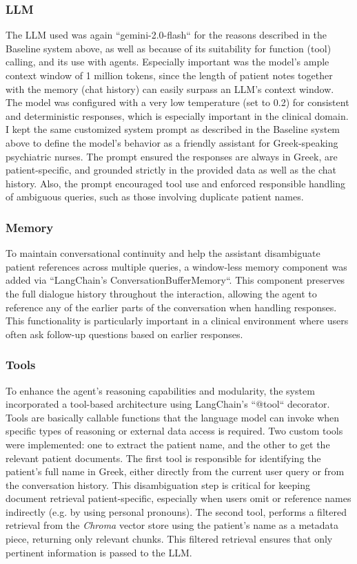 \subsubsection{LLM}
The LLM used was again ``gemini-2.0-flash`` for the reasons described in the Baseline system above, as well as because of its suitability for function (tool) calling, and its use with agents. Especially important was the model's ample context window of 1 million tokens, since the length of patient notes together with the memory (chat history) can easily surpass an LLM’s context window. The model was configured with a very low temperature (set to 0.2) for consistent and deterministic responses, which is especially important in the clinical domain. I kept the same customized system prompt as described in the Baseline system above to define the model's behavior as a friendly assistant for Greek-speaking psychiatric nurses. The prompt ensured the responses are always in Greek, are patient-specific, and grounded strictly in the provided data as well as the chat history. Also, the prompt encouraged tool use and enforced responsible handling of ambiguous queries, such as those involving duplicate patient names.

\subsubsection{Memory}
To maintain conversational continuity and  help the assistant disambiguate patient references across multiple queries, a window-less memory component was added via ``LangChain's ConversationBufferMemory``. This component preserves the full dialogue history throughout the interaction, allowing the agent to reference any of the earlier parts of the conversation when handling responses. This functionality is particularly important in a clinical environment where users often ask follow-up questions based on earlier responses.

\subsubsection{Tools} \label{tools}
To enhance the agent's reasoning capabilities and modularity, the system incorporated a tool-based architecture using LangChain’s ``@tool`` decorator. Tools are basically callable functions that the language model can invoke when specific types of reasoning or external data access is required. Two custom tools were implemented: one to extract the patient name, and the other to get the relevant patient documents. 
The first tool is responsible for identifying the patient’s full name in Greek, either directly from the current user query or from the conversation history. This disambiguation step is critical for keeping document retrieval patient-specific, especially when users omit or reference names indirectly (e.g. by using personal pronouns). 
The second tool, performs a filtered retrieval from the \textit{Chroma} vector store using the patient's name as a metadata piece, returning only relevant chunks. This filtered retrieval ensures that only pertinent information is passed to the LLM.

